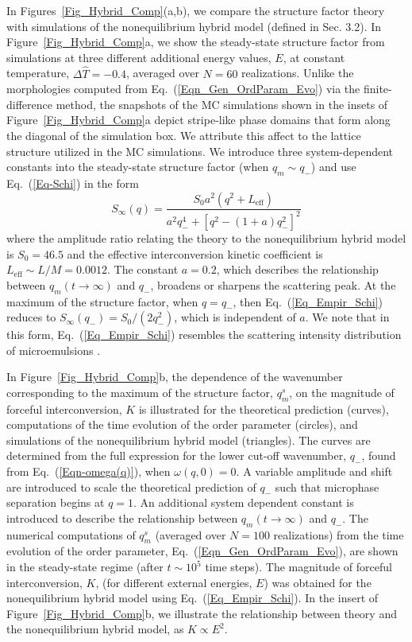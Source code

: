 \documentclass[5p,twocolumn]{elsarticle}
\begin{document}
In Figures~\ref{Fig_Hybrid_Comp}(a,b), we compare the structure factor theory with simulations of the nonequilibrium hybrid model (defined in Sec. 3.2). In Figure~\ref{Fig_Hybrid_Comp}a, we show the steady-state structure factor from simulations at three different additional energy values, $E$, at constant temperature, $\Delta\hat{T}=-0.4$, averaged over $N=60$ realizations. Unlike the morphologies computed from Eq.~(\ref{Eqn_Gen_OrdParam_Evo}) via the finite-difference method, the snapshots of the MC simulations shown in the insets of Figure~\ref{Fig_Hybrid_Comp}a depict stripe-like phase domains that form along the diagonal of the simulation box. We attribute this affect to the lattice structure utilized in the MC simulations. We introduce three system-dependent constants into the steady-state structure factor (when $q_m\sim q_-$) and use Eq.~(\ref{Eq-Schi}) in the form
\begin{equation}\label{Eq_Empir_Schi}
    S_\infty(q) = \frac{S_0a^2(q^2+L_\text{eff})}{a^2q_-^4+[q^2-(1+a)q_-^2]^2}
\end{equation}
where the amplitude ratio relating the theory to the nonequilibrium hybrid model is $S_0=46.5$ and the effective interconversion kinetic coefficient is $L_\text{eff}\sim L/M= 0.0012$. The constant $a = 0.2$, which describes the relationship between $q_m(t\to\infty)$ and $q_-$, broadens or sharpens the scattering peak. At the maximum of the structure factor, when $q = q_-$, then Eq.~(\ref{Eq_Empir_Schi}) reduces to $S_\infty(q_-) = S_0/(2q_-^2)$, which is independent of $a$. We note that in this form, Eq.~(\ref{Eq_Empir_Schi}) resembles the scattering intensity distribution of microemulsions \cite{Teubner_Origin_1987}. 

In Figure~\ref{Fig_Hybrid_Comp}b, the dependence of the wavenumber corresponding to the maximum of the structure factor, $q_m^s$, on the magnitude of forceful interconversion, $K$ is illustrated for the theoretical prediction (curves), computations of the time evolution of the order parameter (circles), and simulations of the nonequilibrium hybrid model (triangles). The curves are determined from the full expression for the lower cut-off wavenumber, $q_-$, found from Eq.~(\ref{Eqn-omega(q)}), when $\omega(q,0)=0$. A variable amplitude and shift are introduced to scale the theoretical prediction of $q_-$ such that microphase separation begins at $q=1$. An additional system dependent constant is introduced to describe the relationship between $q_m(t\to\infty)$ and $q_-$. The numerical computations of $q_m^s$ (averaged over $N=100$ realizations) from the time evolution of the order parameter, Eq.~(\ref{Eqn_Gen_OrdParam_Evo}), are shown in the steady-state regime (after $t\sim 10^5$ time steps). The magnitude of forceful interconversion, $K$, (for different external energies, $E$) was obtained for the nonequilibrium hybrid model using Eq.~(\ref{Eq_Empir_Schi}). In the insert of Figure~\ref{Fig_Hybrid_Comp}b, we illustrate the relationship between theory and the nonequilibrium hybrid model, as $K\propto E^2$.
\end{document}
